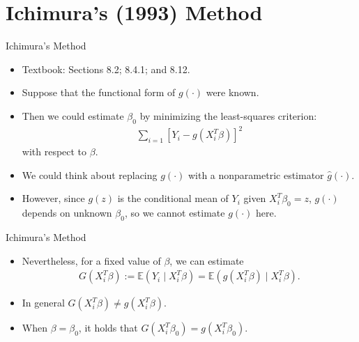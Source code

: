 \documentclass[xcolor=svgnames,dvipdfmx,cjk]{beamer}
\theoremstyle{example}
\begin{document}
\section{Ichimura's (1993) Method}


\begin{frame}{Ichimura's Method}
\begin{itemize}
  \item Textbook: Sections 8.2; 8.4.1; and 8.12.
  \item Suppose that the functional form of $g(\cdot)$ were known.
  \item Then we could estimate $\beta_0$ by minimizing the least-squares criterion:
        \begin{align*}
        \sum_{i=1} \left[ Y_i - g(X_i^{T}\beta) \right]^2
        \end{align*}
        with respect to $\beta$.
  \item We could think about replacing $g(\cdot)$ with a nonparametric estimator $\hat{g}(\cdot)$.
  \item However, since $g(z)$ is the conditional mean of $Y_i$ given $X_i^{T} \beta_0 = z$,
        \alert{$g(\cdot)$ depends on unknown $\beta_0$}, so we cannot estimate $g(\cdot)$ here.
\end{itemize}
\end{frame}

\begin{frame}{Ichimura's Method}
\begin{itemize}
  \item Nevertheless, \alert{for a fixed value of $\beta$}, we can estimate
        \begin{align*}
        G(X_i^{T} \beta) 
          := \mathbb{E} (Y_i \mid X_i^{T}\beta) 
           = \mathbb{E} (g(X_i^{T}\beta) \mid X_i^{T}\beta).
        \end{align*}
  \item In general $G(X_i^{T}\beta) \neq g(X_i^{T} \beta)$.
  \item When $\beta = \beta_0$,
        it holds that $G(X_i^{T}\beta_0) = g(X_i^{T} \beta_0)$. 
\end{itemize}  
\end{frame}
\end{document}
